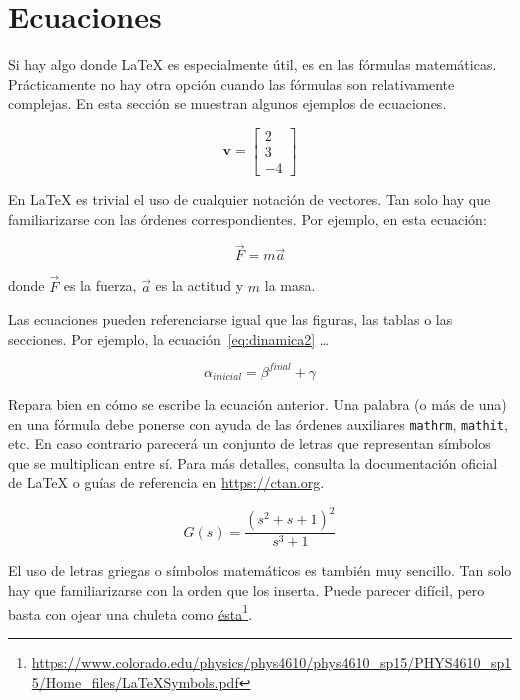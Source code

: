 \section{Ecuaciones} 
\label{sec:ecuaciones}

Si hay algo donde \LaTeX{} es especialmente útil, es en las fórmulas matemáticas.  Prácticamente no hay otra opción cuando las fórmulas son relativamente complejas.  En esta sección se muestran algunos ejemplos de ecuaciones.

\begin{equation}
    \mathbf{v} = \left[
    \begin{array}{c}
        2 \\
        3 \\
        -4 
    \end{array}
    \right]
\end{equation}

En \LaTeX{} es trivial el uso de cualquier notación de vectores.  Tan solo hay que familiarizarse con las órdenes correspondientes.  Por ejemplo, en esta ecuación:

\begin{equation} 
\vec{F} = m \vec{a}
\label{eq:dinamica}
\end{equation}

\noindent donde $\vec{F}$ es la fuerza, $\vec{a}$ es la actitud y $m$ la masa.

Las ecuaciones pueden referenciarse igual que las figuras, las tablas o las secciones.  Por ejemplo, la ecuación~\ref{eq:dinamica2} \ldots

\begin{equation} 
\alpha_{\mathit{inicial}} = \beta^{\mathit{final}} + \gamma
\label{eq:dinamica2}
\end{equation}

Repara bien en cómo se escribe la ecuación anterior.  Una palabra (o más de una) en una fórmula debe ponerse con ayuda de las órdenes auxiliares \texttt{mathrm}, \texttt{mathit}, etc.  En caso contrario parecerá un conjunto de letras que representan símbolos que se multiplican entre sí.  Para más detalles, consulta la documentación oficial de \LaTeX{} o guías de referencia en \url{https://ctan.org}.

\begin{equation}
G(s)=\frac{(s^2+s+1)^2}{s^3+1}
\label{eq:dinamica3}
\end{equation}

El uso de letras griegas o símbolos matemáticos es también muy sencillo.  Tan solo hay que familiarizarse con la orden que los inserta.  Puede parecer difícil, pero basta con ojear una chuleta como \href{https://www.colorado.edu/physics/phys4610/phys4610_sp15/PHYS4610_sp15/Home_files/LaTeXSymbols.pdf}{ésta}\footnote{\url{https://www.colorado.edu/physics/phys4610/phys4610_sp15/PHYS4610_sp15/Home_files/LaTeXSymbols.pdf}}.

